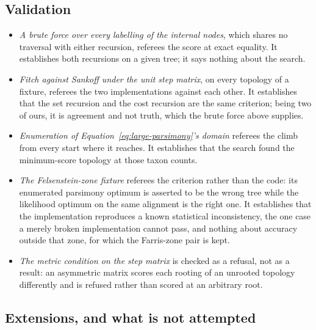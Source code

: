 \documentclass[11pt,a4paper]{article}
\begin{document}
\subsection{Validation}
\label{sec:parsimony:validation}
\begin{itemize}
  \item \emph{A brute force over every labelling of the internal nodes},
    which shares no traversal with either recursion, referees the score at
    exact equality. It establishes both recursions on a given tree; it says
    nothing about the search.
  \item \emph{Fitch against Sankoff under the unit step matrix}, on every
    topology of a fixture, referees the two implementations against each
    other. It establishes that the set recursion and the cost recursion are the
    same criterion; being two of ours, it is agreement and not truth, which the
    brute force above supplies.
  \item \emph{Enumeration of Equation~\ref{eq:large-parsimony}'s domain}
    referees the climb from every start where it reaches. It establishes that
    the search found the minimum-score topology at those taxon counts.
  \item \emph{The Felsenstein-zone fixture} referees the criterion rather than
    the code: its enumerated parsimony optimum is asserted to be the wrong tree
    while the likelihood optimum on the same alignment is the right one. It
    establishes that the implementation reproduces a known statistical
    inconsistency, the one case a merely broken implementation cannot pass, and
    nothing about accuracy outside that zone, for which the Farris-zone pair is
    kept.
  \item \emph{The metric condition on the step matrix} is checked as a
    refusal, not as a result: an asymmetric matrix scores each rooting of an
    unrooted topology differently and is refused rather than scored at an
    arbitrary root.
\end{itemize}

\subsection{Extensions, and what is not attempted}
\label{sec:parsimony:extensions}
\end{document}
